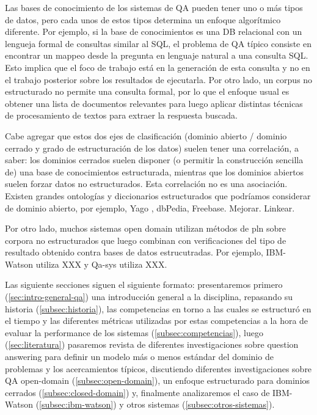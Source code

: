 Las bases de conocimiento de los sistemas de QA pueden tener uno o más tipos de datos, pero cada unos de estos tipos determina un enfoque algorítmico diferente. Por ejemplo, si la base de conocimientos es una DB relacional con un lengueja formal de consultas similar al SQL, el problema de QA típico consiste en encontrar un mappeo desde la pregunta en lenguaje natural a una consulta SQL. Esto implica que el foco de trabajo está en la generación de esta consulta y no en el trabajo posterior sobre los resultados de ejecutarla. Por otro lado, un corpus no estructurado no permite una consulta formal, por lo que el enfoque usual es obtener una lista de documentos relevantes para luego aplicar distintas técnicas de procesamiento de textos para extraer la respuesta buscada.

Cabe agregar que estos dos ejes de clasificación (dominio abierto / dominio cerrado y grado de estructuración de los datos) suelen tener una correlación, a saber: los dominios cerrados suelen disponer (o permitir la construcción sencilla de) una base de conocimientos estructurada, mientras que los dominios abiertos suelen forzar datos no estructurados. Esta correlación no es una asociación. Existen grandes ontologías y diccionarios estructurados que podríamos considerar de dominio abierto, por ejemplo, {\color{red} Yago , dbPedia, Freebase. Mejorar. Linkear}.

Por otro lado, muchos sistemas open domain utilizan métodos de pln sobre corpora no estructurados que luego combinan con verificaciones del tipo de resultado obtenido contra bases de datos estrucutradas. {\color{red} Por ejemplo, IBM-Watson utiliza XXX y Qa-sys utiliza XXX}.

Las siguiente secciones siguen el siguiente formato: presentaremos primero (\ref{sec:intro-general-qa}) una introducción general a la disciplina, repasando su historia (\ref{subsec:historia}), las competencias en torno a las cuales se estructuró en el tiempo y las diferentes métricas utilizadas por estas competencias a la hora de evaluar la performance de los sistemas (\ref{subsec:competencias}), luego (\ref{sec:literatura}) pasaremos revista de diferentes investigaciones sobre question answering para definir un modelo más o menos estándar del dominio de problemas y los acercamientos típicos, discutiendo diferentes investigaciones sobre QA open-domain (\ref{subsec:open-domain}), un enfoque estructurado para dominios cerrados (\ref{subsec:closed-domain}) y, finalmente analizaremos el caso de IBM-Watson (\ref{subsec:ibm-watson}) y otros sistemas (\ref{subsec:otros-sistemas}).


